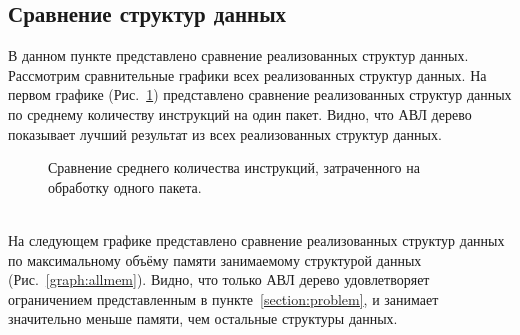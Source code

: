 \documentclass[a4paper, 12pt, titlepage, finall]{extreport}
\begin{document}
        \subsection{Сравнение структур данных}
            В данном пункте представлено сравнение реализованных структур данных. Рассмотрим сравнительные графики всех реализованных структур данных.
            На первом графике (Рис.~\ref{graph:allinst}) представлено сравнение реализованных структур данных по среднему количеству инструкций на один пакет. Видно, что АВЛ дерево показывает лучший результат
            из всех реализованных структур данных.
            \\
            \begin{figure}[ht]
                \centering
                \captionsetup{justification=centering}
                \caption{Сравнение среднего количества инструкций, затраченного на обработку одного пакета.}
                \label{graph:allinst}
            \end{figure}
            \\
            На следующем графике представлено сравнение реализованных структур данных по максимальному объёму памяти занимаемому структурой данных (Рис.~\ref{graph:allmem}). Видно, что только АВЛ дерево удовлетворяет
            ограничением представленным в пункте~\ref{section:problem}, и занимает значительно меньше памяти, чем остальные структуры данных.
            \\
\end{document}
